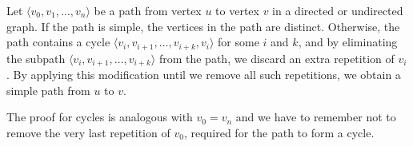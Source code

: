 \exercise
Let $\langle v_0,v_1,\dots,v_n\rangle$ be a path from vertex $u$ to vertex $v$ in a directed or undirected graph.
If the path is simple, the vertices in the path are distinct.
Otherwise, the path contains a cycle $\langle v_i,v_{i+1},\dots,v_{i+k},v_i\rangle$ for some $i$ and $k$, and by eliminating the subpath $\langle v_i,v_{i+1},\dots,v_{i+k}\rangle$ from the path, we discard an extra repetition of $v_i$.
By applying this modification until we remove all such repetitions, we obtain a simple path from $u$ to $v$.

The proof for cycles is analogous with $v_0=v_n$ and we have to remember not to remove the very last repetition of $v_0$, required for the path to form a cycle.
